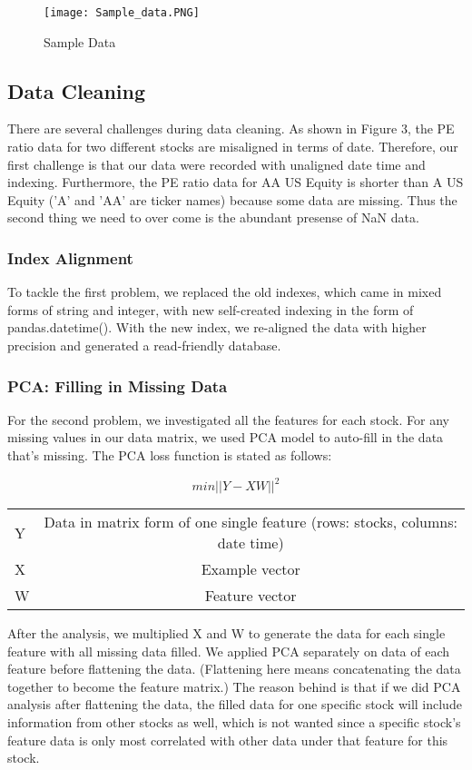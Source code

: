 \documentclass[b4paper]{article}
\begin{document}
\begin{figure}
\centering
\texttt{[image: Sample\_data.PNG]}
\caption{\label{fig:sample data}Sample Data}
\end{figure}

\subsection{Data Cleaning}
There are several challenges during data cleaning. As shown in Figure 3, the PE ratio data for two different stocks are misaligned in terms of date. Therefore, our first challenge is that our data were recorded with unaligned date time and indexing. Furthermore, the PE ratio data for AA US Equity is shorter than A US Equity ('A' and 'AA' are ticker names) because some data are missing. Thus the second thing we need to over come is the abundant presense of NaN data.

\subsubsection{Index Alignment}
To tackle the first problem, we replaced the old indexes, which came in mixed forms of string and integer, with new self-created indexing in the form of pandas.datetime(). With the new index, we re-aligned the data with higher precision and generated a read-friendly database.
\subsubsection{PCA: Filling in Missing Data}
For the second problem, we investigated all the features for each stock. For any missing values in our data matrix, we used PCA model to auto-fill in the data that's missing. The PCA loss function is stated as follows:

\begin{equation}
min ||Y-XW||^2
\end{equation}
\begin{center}
\begin{tabular}{ l | c }
 \hline
Y & Data in matrix form of one single feature (rows: stocks, columns: date time)\\
X & Example vector\\
W & Feature vector\\
\hline
 \end{tabular}
\end{center}

After the analysis, we multiplied X and W to generate the data for each single feature with all missing data filled. We applied PCA separately on data of each feature before flattening the data. (Flattening here means concatenating the data together to become the feature matrix.) The reason behind is that if we did PCA analysis after flattening the data, the filled data for one specific stock will include information from other stocks as well, which is not wanted since a specific stock's feature data is only most correlated with other data under that feature for this stock.
\end{document}
